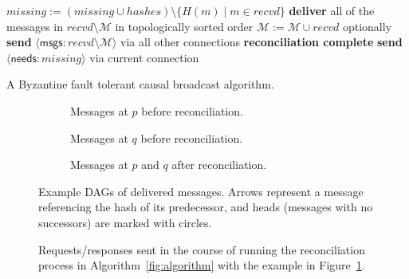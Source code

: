 \documentclass[a4paper,anonymous,USenglish]{lipics-v2019}
\begin{document}
\begin{algorithm}
\begin{algorithmic}[1]
        \State $\mathit{missing} := (\mathit{missing} \cup \mathit{hashes}) \setminus \{H(m) \mid m \in \mathit{recvd}\}$
         \label{line:missing-empty}
            \State \textbf{deliver} all of the messages in $\mathit{recvd} \setminus \mathcal{M}$ in topologically sorted order\label{line:deliver}
            \State $\mathcal{M} := \mathcal{M} \cup \mathit{recvd}$ \label{line:update-m}
            \State optionally \textbf{send} $\langle\mathsf{msgs}: \mathit{recvd} \setminus \mathcal{M}\rangle$ via all other connections\label{line:eager-relay}
            \State \textbf{reconciliation complete} \label{line:finish}
        \Else
            \State \textbf{send} $\langle\mathsf{needs}: \mathit{missing}\rangle$ via current connection \label{line:send-missing}
        \EndIf
    \EndFunction
    \end{algorithmic}
    \caption{A Byzantine fault tolerant causal broadcast algorithm.}\label{fig:algorithm}
\end{algorithm}

\begin{figure}
    \centering
    \begin{subfigure}[b]{0.35\textwidth}
    \centering
    \hspace{0.5cm}
    \captionsetup{width=.9\linewidth}
    \caption{Messages at $p$ before reconciliation.}
    \end{subfigure}%
    \begin{subfigure}[b]{0.26\textwidth}
    \centering
    \hspace{0.5cm}
    \captionsetup{width=.9\linewidth}
    \caption{Messages at $q$ before reconciliation.}
    \end{subfigure}%
    \begin{subfigure}[b]{0.35\textwidth}
    \centering
    
    \captionsetup{width=.9\linewidth}
    \caption{Messages at $p$ and $q$ after reconciliation.}
    \end{subfigure}
    \caption{Example DAGs of delivered messages. Arrows represent a message referencing the hash of its predecessor, and heads (messages with no successors) are marked with circles.}
    \label{fig:example-dags}
\end{figure}

\begin{figure}
    
    \caption{Requests/responses sent in the course of running the reconciliation process in Algorithm~\ref{fig:algorithm} with the example in Figure~\ref{fig:example-dags}.}
    \label{fig:messages}
\end{figure}
\end{document}
